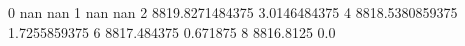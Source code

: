 0 nan nan
1 nan nan
2 8819.8271484375 3.0146484375
4 8818.5380859375 1.7255859375
6 8817.484375 0.671875
8 8816.8125 0.0

